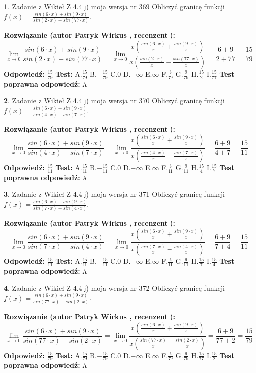 \documentclass[12pt, a4paper]{article}
\theoremstyle{definition} %
\newtheorem{zad}{}
\newcommand{\zadStart}[1]{\begin{zad}#1\newline}
\newcommand{\zadStop}{\end{zad}}
\newcommand{\rozwStart}[2]{\noindent \textbf{Rozwiązanie (autor #1 , recenzent #2): }\newline}
\newcommand{\rozwStop}{\newline}
\newcommand{\odpStart}{\noindent \textbf{Odpowiedź:}\newline}
\newcommand{\odpStop}{\newline}
\newcommand{\testStart}{\noindent \textbf{Test:}\newline}
\newcommand{\testStop}{\newline}
\newcommand{\kluczStart}{\noindent \textbf{Test poprawna odpowiedź:}\newline}
\newcommand{\kluczStop}{\newline}
\begin{document}
\zadStart{Zadanie z Wikieł Z 4.4 j) moja wersja nr 369}
Obliczyć granicę funkcji $f(x)=\frac{sin(6\cdot x) +sin(9\cdot x)}{sin(2\cdot x) -sin(77\cdot x)}$.
\zadStop
\rozwStart{Patryk Wirkus}{}
$$\lim\limits_{x\to 0}\frac{sin(6\cdot x) +sin(9\cdot x)}{sin(2\cdot x) -sin(77\cdot x)}=\lim\limits_{x\to 0}\frac{x(\frac{sin(6\cdot x)}{x}+\frac{sin(9\cdot x)}{x})}{x(\frac{sin(2\cdot x)}{x}-\frac{sin(77\cdot x)}{x})}=\frac{6+9}{2+77} = \frac{15}{79}$$
\rozwStop
\odpStart
$\frac{15}{79}$
\odpStop
\testStart
A.$\frac{15}{79}$
B.$-\frac{15}{79}$
C.$0$
D.$-\infty$
E.$\infty$
F.$\frac{6}{79}$
G.$\frac{9}{79}$
H.$\frac{15}{2}$
I.$\frac{15}{77}$
\testStop
\kluczStart
A
\kluczStop



\zadStart{Zadanie z Wikieł Z 4.4 j) moja wersja nr 370}
Obliczyć granicę funkcji $f(x)=\frac{sin(6\cdot x) +sin(9\cdot x)}{sin(4\cdot x) -sin(7\cdot x)}$.
\zadStop
\rozwStart{Patryk Wirkus}{}
$$\lim\limits_{x\to 0}\frac{sin(6\cdot x) +sin(9\cdot x)}{sin(4\cdot x) -sin(7\cdot x)}=\lim\limits_{x\to 0}\frac{x(\frac{sin(6\cdot x)}{x}+\frac{sin(9\cdot x)}{x})}{x(\frac{sin(4\cdot x)}{x}-\frac{sin(7\cdot x)}{x})}=\frac{6+9}{4+7} = \frac{15}{11}$$
\rozwStop
\odpStart
$\frac{15}{11}$
\odpStop
\testStart
A.$\frac{15}{11}$
B.$-\frac{15}{11}$
C.$0$
D.$-\infty$
E.$\infty$
F.$\frac{6}{11}$
G.$\frac{9}{11}$
H.$\frac{15}{4}$
I.$\frac{15}{7}$
\testStop
\kluczStart
A
\kluczStop



\zadStart{Zadanie z Wikieł Z 4.4 j) moja wersja nr 371}
Obliczyć granicę funkcji $f(x)=\frac{sin(6\cdot x) +sin(9\cdot x)}{sin(7\cdot x) -sin(4\cdot x)}$.
\zadStop
\rozwStart{Patryk Wirkus}{}
$$\lim\limits_{x\to 0}\frac{sin(6\cdot x) +sin(9\cdot x)}{sin(7\cdot x) -sin(4\cdot x)}=\lim\limits_{x\to 0}\frac{x(\frac{sin(6\cdot x)}{x}+\frac{sin(9\cdot x)}{x})}{x(\frac{sin(7\cdot x)}{x}-\frac{sin(4\cdot x)}{x})}=\frac{6+9}{7+4} = \frac{15}{11}$$
\rozwStop
\odpStart
$\frac{15}{11}$
\odpStop
\testStart
A.$\frac{15}{11}$
B.$-\frac{15}{11}$
C.$0$
D.$-\infty$
E.$\infty$
F.$\frac{6}{11}$
G.$\frac{9}{11}$
H.$\frac{15}{7}$
I.$\frac{15}{4}$
\testStop
\kluczStart
A
\kluczStop



\zadStart{Zadanie z Wikieł Z 4.4 j) moja wersja nr 372}
Obliczyć granicę funkcji $f(x)=\frac{sin(6\cdot x) +sin(9\cdot x)}{sin(77\cdot x) -sin(2\cdot x)}$.
\zadStop
\rozwStart{Patryk Wirkus}{}
$$\lim\limits_{x\to 0}\frac{sin(6\cdot x) +sin(9\cdot x)}{sin(77\cdot x) -sin(2\cdot x)}=\lim\limits_{x\to 0}\frac{x(\frac{sin(6\cdot x)}{x}+\frac{sin(9\cdot x)}{x})}{x(\frac{sin(77\cdot x)}{x}-\frac{sin(2\cdot x)}{x})}=\frac{6+9}{77+2} = \frac{15}{79}$$
\rozwStop
\odpStart
$\frac{15}{79}$
\odpStop
\testStart
A.$\frac{15}{79}$
B.$-\frac{15}{79}$
C.$0$
D.$-\infty$
E.$\infty$
F.$\frac{6}{79}$
G.$\frac{9}{79}$
H.$\frac{15}{77}$
I.$\frac{15}{2}$
\testStop
\kluczStart
A
\kluczStop
\end{document}
